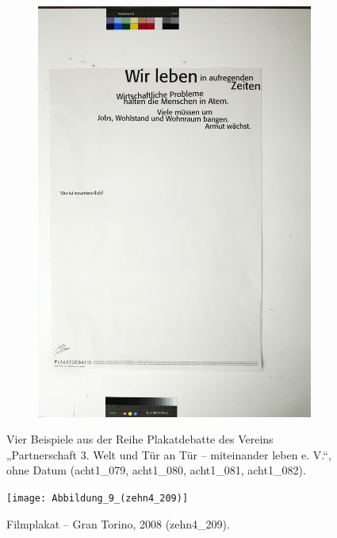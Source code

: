 \documentclass[a4paper,12pt,ngerman]{article}
\begin{document}
\begin{figure}[ht]
\begin{subfigure}[b]{0.5\linewidth}
	\includegraphics[width=\linewidth]{Abbildung_8d_(acht1_082)}
	\end{subfigure}	
\caption{Vier Beispiele aus der Reihe Plakatdebatte des Vereins „Partnerschaft 3. Welt und Tür an Tür – miteinander leben e. V.“, ohne Datum (acht1\_079, acht1\_080, acht1\_081, acht1\_082).}
\end{figure}

\newpage
\begin{figure}[ht]
\texttt{[image: Abbildung\_9\_(zehn4\_209)]}
\centering
\caption{Filmplakat – Gran Torino, 2008 (zehn4\_209).}
\end{figure}
\end{document}
